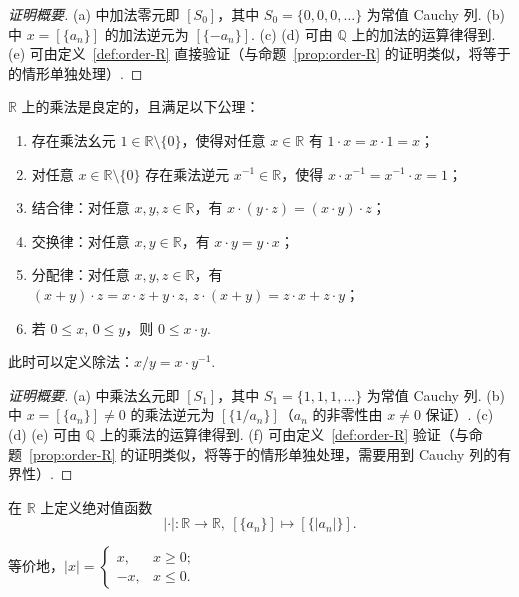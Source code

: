 \documentclass[../main.tex]{subfiles}
\begin{document}
{
\renewcommand{\qedsymbol}{}
\begin{proof}[证明概要]
    (a) 中加法零元即 $[S_0]$，其中 $S_0 = \{0, 0, 0, \dots\}$ 为常值 Cauchy 列. 
    (b) 中 $x = [\{a_n\}]$ 的加法逆元为 $[\{-a_n\}]$. 
    (c) (d) 可由 $\mathbb Q$ 上的加法的运算律得到.  
    (e) 可由定义~\ref{def:order-R} 直接验证（与命题~\ref{prop:order-R} 的证明类似，将等于的情形单独处理）. 
\end{proof}
}

\begin{proposition} \label{prop:times-R}
    $\mathbb R$ 上的乘法是良定的，且满足以下公理：
    \begin{enumerate}[label=(\alph*)]
        \item 存在乘法幺元 $1 \in \mathbb R \setminus \{0\}$，使得对任意 $x \in \mathbb R$ 有 $1 \cdot x = x \cdot 1 = x$；
        \item 对任意 $x \in \mathbb R \setminus \{0\}$ 存在乘法逆元 $x^{-1} \in \mathbb R$，使得 $x \cdot x^{-1} = x^{-1} \cdot x = 1$；
        \item 结合律：对任意 $x, y, z \in \mathbb R$，有 $x \cdot (y \cdot z) = (x \cdot y) \cdot z$；
        \item 交换律：对任意 $x, y \in \mathbb R$，有 $x \cdot y = y \cdot x$；
        \item 分配律：对任意 $x, y, z \in \mathbb R$，有 $(x + y) \cdot z = x \cdot z + y \cdot z,\, z \cdot (x + y) = z \cdot x + z \cdot y$；
        \item 若 $0 \leqslant x,\, 0 \leqslant y$，则 $0 \leqslant x \cdot y$. 
    \end{enumerate}
    此时可以定义除法：$x / y = x \cdot y^{-1}$. 
\end{proposition}

{
\renewcommand{\qedsymbol}{}
\begin{proof}[证明概要]
    (a) 中乘法幺元即 $[S_1]$，其中 $S_1 = \{1, 1, 1, \dots\}$ 为常值 Cauchy 列. 
    (b) 中 $x = [\{a_n\}] \neq 0$ 的乘法逆元为 $[\{1 / a_n\}]$（$a_n$ 的非零性由 $x \neq 0$ 保证）. 
    (c) (d) (e) 可由 $\mathbb Q$ 上的乘法的运算律得到.  
    (f) 可由定义~\ref{def:order-R} 验证（与命题~\ref{prop:order-R} 的证明类似，将等于的情形单独处理，需要用到 Cauchy 列的有界性）. 
\end{proof}
}

\begin{definition} \label{def:abs-func-R}
    在 $\mathbb R$ 上定义绝对值函数 
    $$
    | \cdot |:\mathbb R \to \mathbb R, \ [\{a_n\}] \mapsto [\{|a_n|\}]. 
    $$
    
    等价地，$|x| = \begin{cases}
        x, & x \geqslant 0; \\
        -x, & x \leqslant 0.
    \end{cases}$
\end{definition}
\end{document}
